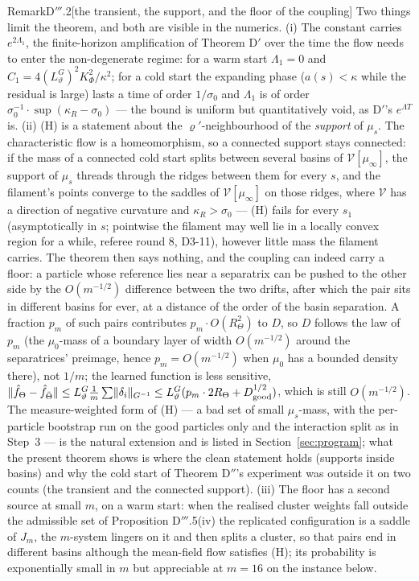 \begin{rmk}{Remark}{D$'''$.2}[the transient, the support, and the floor of the coupling]
Two things limit the theorem, and both are visible in the numerics. (i) The constant carries $e^{2\Lambda_1}$, the
finite-horizon amplification of Theorem D$'$ over the time the flow needs to enter the non-degenerate regime: for a
warm start $\Lambda_1 = 0$ and $C_1 = 4(L_\vartheta^G)^2K_\Phi^2/\kappa^2$; for a cold start the expanding phase
($a(s) < \kappa$ while the residual is large) lasts a time of order $1/\sigma_0$ and $\Lambda_1$ is of order
$\sigma_0^{-1}\cdot\sup(\kappa_R - \sigma_0)$ --- the bound is uniform but quantitatively void, as D$'$'s $e^{\Lambda T}$
is. (ii) (H) is a statement about the $\varrho'$-neighbourhood of the \emph{support} of $\mu_s$. The characteristic
flow is a homeomorphism, so a connected support stays connected: if the mass of a connected cold start splits between
several basins of $\mathcal{V}[\mu_\infty]$, the support of $\mu_s$ threads through the ridges between them for every
$s$, and the filament's points converge to the saddles of $\mathcal{V}[\mu_\infty]$ on those ridges, where
$\mathcal{V}$ has a direction of negative curvature and $\kappa_R > \sigma_0$ --- (H) fails for every $s_1$
(asymptotically in $s$; pointwise the filament may well lie in a locally convex region for a while, referee round 8,
D3-11), however little mass the filament carries. The theorem then says nothing, and the coupling can indeed carry a
floor: a particle whose reference lies near a separatrix can be pushed to the other side by the $O(m^{-1/2})$
difference between the two drifts, after which the pair sits in different basins for ever, at a distance of the order
of the basin separation. A fraction $p_m$ of such pairs contributes $p_m\cdot O(R_\Theta^2)$ to $D$, so $D$ follows
the law of $p_m$ (the $\mu_0$-mass of a boundary layer of width $O(m^{-1/2})$ around the separatrices' preimage, hence
$p_m = O(m^{-1/2})$ when $\mu_0$ has a bounded density there), not $1/m$; the learned function is less sensitive,
$\lVert \hat f_\Theta - \hat f_{\bar\Theta}\rVert\le L_\vartheta^G\frac1m\sum\lVert \delta_i\rVert_{G^{-1}}
\le L_\vartheta^G(p_m\cdot2R_\Theta + D_{\mathrm{good}}^{1/2})$, which is still $O(m^{-1/2})$. The measure-weighted
form of (H) --- a bad set of small $\mu_s$-mass, with the per-particle bootstrap run on the good particles only and
the interaction split as in Step~3 --- is the natural extension and is listed in Section~\ref{sec:program}; what the
present theorem shows is where the clean statement holds (supports inside basins) and why the cold start of Theorem
D$''$'s experiment was outside it on two counts (the transient and the connected support). (iii) The floor has a
second source at small $m$, on a warm start: when the realised cluster weights fall outside the admissible set of
Proposition D$'''$.5(iv) the replicated configuration is a saddle of $J_m$, the $m$-system lingers on it and then
splits a cluster, so that pairs end in different basins although the mean-field flow satisfies (H); its probability
is exponentially small in $m$ but appreciable at $m = 16$ on the instance below.
\end{rmk}

